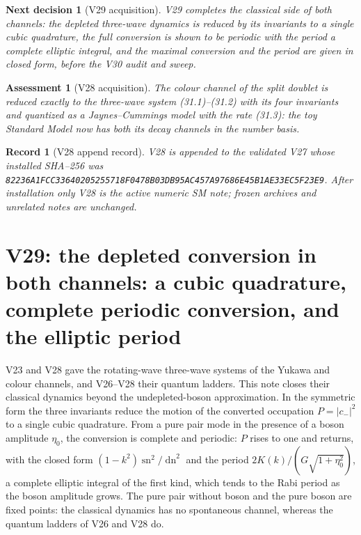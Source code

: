 \documentclass[11pt]{article}
\newtheorem{decision}[theorem]{Next decision}
\newtheorem{assessment}[theorem]{Assessment}
\newtheorem{record}[theorem]{Record}
\theoremstyle{remark}
\begin{document}
\begin{decision}[V29 acquisition]
\label{dec:v20v28-next}
V29 completes the classical side of both channels: the depleted
three-wave dynamics is reduced by its invariants to a single cubic
quadrature, the full conversion is shown to be periodic with the
period a complete elliptic integral, and the maximal conversion and
the period are given in closed form, before the V30 audit and sweep.
\end{decision}

\begin{assessment}[V28 acquisition]
\label{ass:v20v28}
The colour channel of the split doublet is reduced exactly to the
three-wave system (31.1)--(31.2) with its four invariants and
quantized as a Jaynes--Cummings model with the rate (31.3): the toy
Standard Model now has both its decay channels in the number basis.
\end{assessment}

\begin{record}[V28 append record]
\label{rec:v20v28}
V28 is appended to the validated V27 whose installed SHA--256 was
\texttt{82236A1FCC33640205255718F0478B03DB95AC457A97686E45B1AE33EC5F23E9}.
After installation only V28 is the active numeric SM note; frozen
archives and unrelated notes are unchanged.
\end{record}


\section{V29: the depleted conversion in both channels: a cubic quadrature, complete periodic conversion, and the elliptic period}
\label{sec:v20v29}

V23 and V28 gave the rotating-wave three-wave systems of the Yukawa
and colour channels, and V26--V28 their quantum ladders.  This note
closes their classical dynamics beyond the undepleted-boson
approximation.  In the symmetric form the three invariants reduce
the motion of the converted occupation \(P=|c_-|^2\) to a single cubic
quadrature.  From a pure pair mode in the presence of a boson
amplitude \(\eta_0\), the conversion is complete and periodic: \(P\)
rises to one and returns, with the closed form
\((1-k^2)\operatorname{sn}^2/\operatorname{dn}^2\) and the period
\(2K(k)/(G\sqrt{1+\eta_0^2})\), a complete elliptic integral of the
first kind, which tends to the Rabi period as the boson amplitude
grows.  The pure pair without boson and the pure boson are fixed
points: the classical dynamics has no spontaneous channel, whereas
the quantum ladders of V26 and V28 do.
\end{document}

